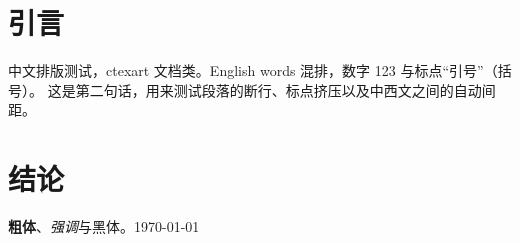 \documentclass{ctexart}
\begin{document}
\section{引言}
中文排版测试，ctexart 文档类。English words 混排，数字 123 与标点“引号”（括号）。
这是第二句话，用来测试段落的断行、标点挤压以及中西文之间的自动间距。

\section{结论}
\textbf{粗体}、\emph{强调}与{\heiti 黑体}。\today
\end{document}
